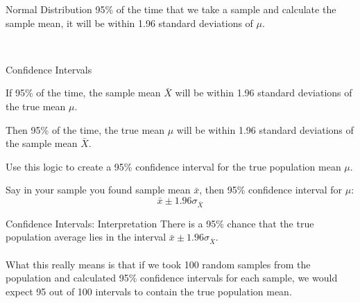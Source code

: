 \documentclass{./../div_teaching_slides}
\begin{document}
\begin{frame}{Normal Distribution}
\vspace{-0.35em} 
95\% of the time that we take a sample and calculate the sample mean, it will be within 1.96 standard deviations of $\mu$.
\vspace{1.7em} 

\centering
{} \\
\end{frame}

\begin{frame}{Confidence Intervals}
\begin{witemize}
  \item If 95\% of the time, the sample mean $\bar{X}$ will be within 1.96 standard deviations of the true mean $\mu$.
  \item Then 95\% of the time, the true mean $\mu$ will be within 1.96 standard deviations of the sample mean $\bar{X}$.
  \item Use this logic to create a 95\% confidence interval for the true population mean $\mu$. 
  \item Say in your sample you found sample mean $\bar{x}$, then 95\% confidence interval for $\mu$:
  $$ \bar{x} \pm 1.96 \sigma_{\bar{X}} $$
\end{witemize}
\end{frame}

\begin{frame}{Confidence Intervals: Interpretation}
\vfill
There is a 95\% chance that the true population average lies in the interval $ \bar{x} \pm 1.96 \sigma_{\bar{X}} $. \\~\\

What this really means is that if we took 100 random samples from the population and calculated 95\% confidence intervals for each sample, we would expect 95 out of 100 intervals to contain the true population mean.
\vfill
\end{frame}
\end{document}
